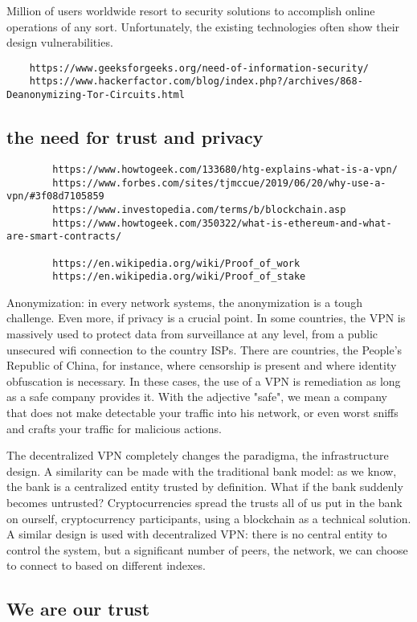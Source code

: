 \documentclass[]{article}
\begin{document}
	Million of users worldwide resort to security solutions to accomplish online operations of any sort. Unfortunately, the existing technologies often show their design vulnerabilities.

	\begin{verbatim}
	https://www.geeksforgeeks.org/need-of-information-security/
	https://www.hackerfactor.com/blog/index.php?/archives/868-Deanonymizing-Tor-Circuits.html
	\end{verbatim}
	
	\subsection{the need for trust and privacy}
	\begin{verbatim}
		https://www.howtogeek.com/133680/htg-explains-what-is-a-vpn/
		https://www.forbes.com/sites/tjmccue/2019/06/20/why-use-a-vpn/#3f08d7105859
		https://www.investopedia.com/terms/b/blockchain.asp
		https://www.howtogeek.com/350322/what-is-ethereum-and-what-are-smart-contracts/
		
		https://en.wikipedia.org/wiki/Proof_of_work
		https://en.wikipedia.org/wiki/Proof_of_stake
	\end{verbatim}
	Anonymization: in every network systems, the anonymization is a tough challenge. Even more, if privacy is a crucial point. In some countries, the VPN is massively used to protect data from surveillance at any level, from a public unsecured wifi connection to the country ISPs. There are countries, the People's Republic of China, for instance, where censorship is present and where identity obfuscation is necessary. In these cases, the use of a VPN is remediation as long as a safe company provides it. With the adjective "safe", we mean a company that does not make detectable your traffic into his network, or even worst sniffs and crafts your traffic for malicious actions. 

	The decentralized VPN completely changes the paradigma, the infrastructure design.
	A similarity can be made with the traditional bank model: as we know, the bank is a centralized entity trusted by definition. What if the bank suddenly becomes untrusted? Cryptocurrencies spread the trusts all of us put in the bank on ourself, cryptocurrency participants, using a blockchain as a technical solution. 
	A similar design is used with decentralized VPN: there is no central entity to control the system, but a significant number of peers, the network, we can choose to connect to based on different indexes.
	\subsection{We are our trust}
\end{document}

